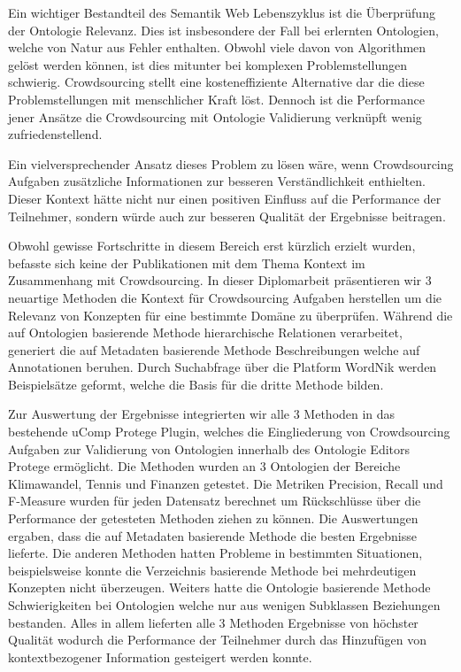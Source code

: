 \begin{kurzfassung}
	Ein wichtiger Bestandteil des Semantik Web Lebenszyklus ist die Überprüfung der Ontologie Relevanz. Dies ist insbesondere der Fall bei erlernten 
	Ontologien, welche von Natur aus Fehler enthalten. Obwohl viele davon von Algorithmen gelöst werden können, ist dies mitunter bei
	komplexen Problemstellungen schwierig. Crowdsourcing stellt eine kosteneffiziente Alternative dar die diese Problemstellungen mit menschlicher
	Kraft löst. Dennoch ist die Performance jener Ansätze die Crowdsourcing mit Ontologie Validierung verknüpft wenig zufriedenstellend. 
	
	Ein vielversprechender Ansatz dieses Problem zu lösen wäre, wenn Crowdsourcing Aufgaben zusätzliche Informationen zur besseren
	Verständlichkeit enthielten. Dieser Kontext hätte nicht nur einen positiven Einfluss auf die Performance der Teilnehmer, sondern würde auch 
	zur besseren Qualität der Ergebnisse beitragen.
	
	Obwohl gewisse Fortschritte in diesem Bereich erst kürzlich erzielt wurden, befasste sich keine der Publikationen mit dem Thema Kontext
	im Zusammenhang mit Crowdsourcing. In dieser Diplomarbeit präsentieren wir 3 neuartige Methoden die Kontext für Crowdsourcing Aufgaben herstellen 
	um die Relevanz von Konzepten für eine bestimmte Domäne zu überprüfen. Während die auf Ontologien basierende Methode hierarchische Relationen
	verarbeitet, generiert die auf Metadaten basierende Methode Beschreibungen welche auf Annotationen beruhen. Durch Suchabfrage über die Platform
	WordNik	werden Beispielsätze geformt, welche die Basis für die dritte Methode bilden. 
	
	Zur Auswertung der Ergebnisse integrierten wir alle 3 Methoden in das bestehende uComp Protege Plugin, welches die Eingliederung von Crowdsourcing 
	Aufgaben zur Validierung von Ontologien innerhalb des Ontologie Editors Protege ermöglicht. Die Methoden wurden an 3 Ontologien der Bereiche
	Klimawandel, Tennis und Finanzen getestet. Die Metriken Precision, Recall und F-Measure wurden für jeden Datensatz berechnet um Rückschlüsse über 
	die Performance der getesteten Methoden ziehen zu können. Die Auswertungen ergaben, dass die auf Metadaten basierende Methode die besten
	Ergebnisse lieferte. Die anderen Methoden hatten Probleme in bestimmten Situationen, beispielsweise konnte die Verzeichnis basierende Methode 
	bei mehrdeutigen Konzepten nicht überzeugen. Weiters hatte die Ontologie basierende Methode Schwierigkeiten bei Ontologien welche nur aus wenigen
	Subklassen Beziehungen bestanden. Alles in allem lieferten alle 3 Methoden Ergebnisse von höchster Qualität wodurch die Performance der Teilnehmer
	durch das Hinzufügen von kontextbezogener Information gesteigert werden konnte. 
	
\end{kurzfassung}
